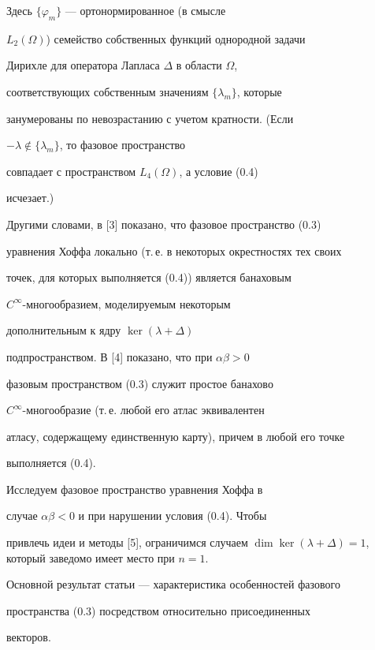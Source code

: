 Здесь $\{\varphi_{m}\}$ --- ортонормированное (в смысле


$L_{2}(\Omega)$) семейство собственных функций однородной задачи


Дирихле для оператора Лапласа $\Delta$ в области $\Omega$,


соответствующих собственным значениям $\{\lambda_{m}\}$, которые


занумерованы по невозрастанию с учетом кратности. (Если


$-\lambda\notin\{\lambda_{m}\}$, то фазовое пространство


совпадает с пространством $L_{4}(\Omega)$, а условие (0.4)


исчезает.)





Другими словами, в [3] показано, что фазовое пространство (0.3)


уравнения Хоффа локально (т.\,е. в некоторых окрестностях тех своих


точек, для которых выполняется (0.4)) является банаховым


$C^{\infty}$-многообразием, моделируемым некоторым


дополнительным к ядру $\ker(\lambda + \Delta)$


подпространством. В [4] показано, что при $\alpha\beta>0$


фазовым пространством (0.3) служит простое банахово


$C^{\infty}$-многообразие (т.\,е. любой его атлас эквивалентен


атласу, содержащему единственную карту), причем в любой его точке


выполняется (0.4).





Исследуем фазовое пространство  уравнения Хоффа в


случае $\alpha\beta<0$ и при нарушении условия (0.4). Чтобы


привлечь идеи и методы [5], ограничимся случаем $\dim


\ker(\lambda + \Delta)=1$, который заведомо имеет место при $n=1$.


Основной результат статьи --- характеристика особенностей фазового


пространства (0.3) посредством относительно присоединенных


векторов.





